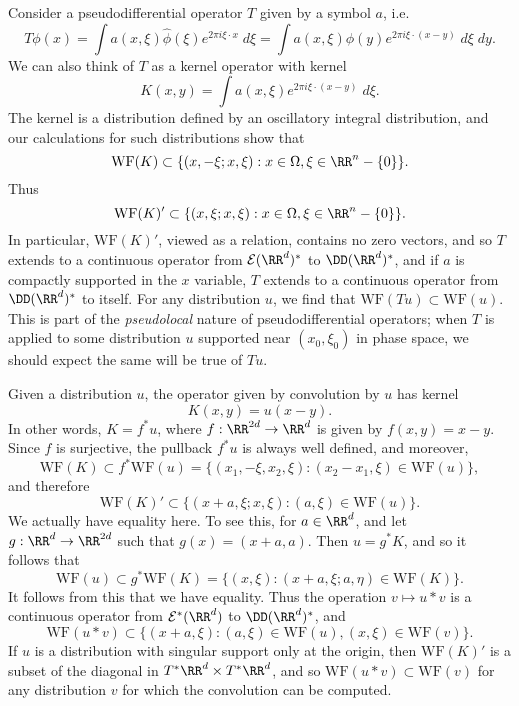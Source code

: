 \begin{example}
    Consider a pseudodifferential operator $T$ given by a symbol $a$, i.e.
    \[ T\phi(x) = \int a(x,\xi) \widehat{\phi}(\xi) e^{2 \pi i \xi \cdot x}\; d\xi = \int a(x,\xi) \phi(y) e^{2 \pi i \xi \cdot (x - y)}\; d\xi\; dy. \]
    We can also think of $T$ as a kernel operator with kernel
    \[ K(x,y) = \int a(x,\xi) e^{2 \pi i \xi \cdot (x - y)} \; d\xi. \]
    The kernel is a distribution defined by an oscillatory integral distribution, and our calculations for such distributions show that
    \[ \text{WF}(K) \subset \{ (x,-\xi;x,\xi) : x \in \Omega, \xi \in \RR^n - \{ 0 \} \}. \]
    Thus
    \[ \text{WF}(K)' \subset \{ (x,\xi;x,\xi) : x \in \Omega, \xi \in \RR^n - \{ 0 \} \}. \]
    In particular, $\text{WF}(K)'$, viewed as a relation, contains no zero vectors, and so $T$ extends to a continuous operator from $\mathcal{E}(\RR^d)^*$ to $\DD(\RR^d)^*$, and if $a$ is compactly supported in the $x$ variable, $T$ extends to a continuous operator from $\DD(\RR^d)^*$ to itself. For any distribution $u$, we find that $\text{WF}(Tu) \subset \text{WF}(u)$. This is part of the \emph{pseudolocal} nature of pseudodifferential operators; when $T$ is applied to some distribution $u$ supported near $(x_0,\xi_0)$ in phase space, we should expect the same will be true of $Tu$.
\end{example}

\begin{example}
    Given a distribution $u$, the operator given by convolution by $u$ has kernel
    \[ K(x,y) = u(x-y). \]
    In other words, $K = f^* u$, where $f: \RR^{2d} \to \RR^d$ is given by $f(x,y) = x - y$. Since $f$ is surjective, the pullback $f^* u$ is always well defined, and moreover,
    \[ \text{WF}(K) \subset f^* \text{WF}(u) = \{ (x_1,-\xi,x_2,\xi): (x_2 - x_1, \xi) \in \text{WF}(u) \}, \]     
    and therefore
    \[ \text{WF}(K)' \subset \{ (x+a,\xi;x,\xi): (a,\xi) \in \text{WF}(u) \}. \]
    We actually have equality here. To see this, for $a \in \RR^d$, and let $g: \RR^d \to \RR^{2d}$ such that $g(x) = (x + a, a)$. Then $u = g^* K$, and so it follows that
    \[ \text{WF}(u) \subset g^* \text{WF}(K) = \{ (x,\xi): (x+a, \xi; a, \eta) \in \text{WF}(K) \}. \]
    It follows from this that we have equality. Thus the operation $v \mapsto u * v$ is a continuous operator from $\mathcal{E}^*(\RR^d)$ to $\DD(\RR^d)^*$, and
    \[ \text{WF}(u * v) \subset \{ (x+a,\xi): (a,\xi) \in \text{WF}(u), (x,\xi) \in \text{WF}(v) \}. \]
    If $u$ is a distribution with singular support only at the origin, then $\text{WF}(K)'$ is a subset of the diagonal in $T^* \RR^d \times T^* \RR^d$, and so $\text{WF}(u * v) \subset \text{WF}(v)$ for any distribution $v$ for which the convolution can be computed.
\end{example}

